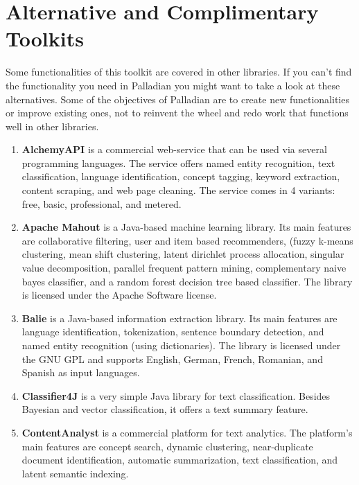 \section{Alternative and Complimentary Toolkits}

\label{sec:alternativesToPalladian}
Some functionalities of this toolkit are covered in other libraries. If you can't find the functionality you need in Palladian you might want to take a look at these alternatives. Some of the objectives of Palladian are to create new functionalities or improve existing ones, not to reinvent the wheel and redo work that functions well in other libraries.

\begin{enumerate}

	\item \textbf{AlchemyAPI} \cite{alchemyapi} is a commercial web-service that can be used via several programming languages. The service offers named entity recognition, text classification, language identification, concept tagging, keyword extraction, content scraping, and web page cleaning.
The service comes in 4 variants: free, basic, professional, and metered.

	\item \textbf{Apache Mahout} \cite{settings2apache} is a Java-based machine learning library. Its main features are collaborative filtering, user and item based recommenders, (fuzzy k-means clustering, mean shift clustering, latent dirichlet process allocation, singular value decomposition, parallel frequent pattern mining, complementary naive bayes classifier, and a random forest decision tree based classifier.
The library is licensed under the Apache Software license.

	\item \textbf{Balie} \cite{balie} is a Java-based information extraction library. Its main features are language identification, tokenization, sentence boundary detection, and named entity recognition (using dictionaries).
The library is licensed under the GNU GPL and supports English, German, French, Romanian, and Spanish as input languages.

	\item \textbf{Classifier4J} \cite{classifier4j} is a very simple Java library for text classification. Besides Bayesian and vector classification, it offers a text summary feature.

	\item \textbf{ContentAnalyst} \cite{contentanalyst} is a commercial platform for text analytics. The platform's main features are concept search, dynamic clustering, near-duplicate document identification, automatic summarization, text classification, and latent semantic indexing.


\end{enumerate}
